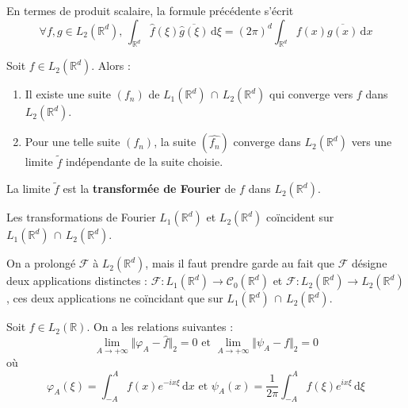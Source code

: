   \begin{remark}
    En termes de produit scalaire, la formule précédente s'écrit
    \[ \forall f, g \in L_2(\mathbb{R}^d), \, \int_{\mathbb{R}^d} \widehat{f}(\xi) \overline{\widehat{g}(\xi)} \, \mathrm{d}\xi = (2 \pi)^d \int_{\mathbb{R}^d} f(x) \overline{g(x)} \, \mathrm{d}x \]
  \end{remark}

  \begin{theorem}
    Soit $f \in L_2(\mathbb{R}^d)$. Alors :
    \begin{enumerate}[label={\bfseries(\roman*)}]
      \item Il existe une suite $(f_n)$ de $L_1(\mathbb{R}^d) \, \cap \, L_2(\mathbb{R}^d)$ qui converge vers $f$ dans $L_2(\mathbb{R}^d)$.
      \item Pour une telle suite $(f_n)$, la suite $(\widehat{f_n})$ converge dans $L_2(\mathbb{R}^d)$ vers une limite $\widetilde{f}$ indépendante de la suite choisie.
    \end{enumerate}
  \end{theorem}

  \begin{definition}
    La limite $\widetilde{f}$ est la \textbf{transformée de Fourier} de $f$ dans $L_2(\mathbb{R}^d)$.
  \end{definition}

  \begin{proposition}
    Les transformations de Fourier $L_1(\mathbb{R}^d)$ et $L_2(\mathbb{R}^d)$ coïncident sur $L_1(\mathbb{R}^d) \, \cap \, L_2(\mathbb{R}^d)$.
  \end{proposition}

  \begin{remark}
    On a prolongé $\mathcal{F}$ à $L_2(\mathbb{R}^d)$, mais il faut prendre garde au fait que $\mathcal{F}$ désigne deux applications distinctes : $\mathcal{F} : L_1(\mathbb{R}^d) \rightarrow \mathcal{C}_0(\mathbb{R}^d)$ et $\mathcal{F} : L_2(\mathbb{R}^d) \rightarrow L_2(\mathbb{R}^d)$, ces deux applications ne coïncidant que sur $L_1(\mathbb{R}^d) \, \cap \, L_2(\mathbb{R}^d)$.
  \end{remark}

  \begin{proposition}
    Soit $f \in L_2(\mathbb{R})$. On a les relations suivantes :
    \[ \lim_{A \rightarrow +\infty} \Vert \varphi_A - \widehat{f} \Vert_2 = 0 \text{ et } \lim_{A \rightarrow +\infty} \Vert \psi_A - f \Vert_2 = 0 \]
    où
    \[ \varphi_A(\xi) = \int_{-A}^{A} f(x) e^{-ix\xi} \, \mathrm{d}x \text{ et } \psi_A(x) = \frac{1}{2 \pi} \int_{-A}^{A} \widehat{f}(\xi) e^{ix\xi} \, \mathrm{d}\xi \]
  \end{proposition}


